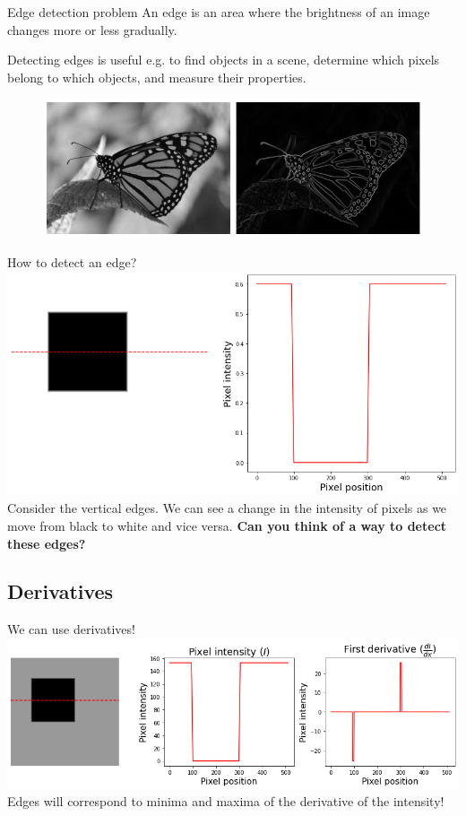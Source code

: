 \documentclass[9pt, aspectratio=169]{beamer}
\begin{document}
\begin{frame}
    {Edge detection problem}
    An edge is an area where the brightness of an image changes more or less gradually.

    Detecting edges is useful e.g. to find objects in a scene, determine which pixels belong to which objects, and measure their properties.
    \begin{figure}
        \includegraphics[width=\textwidth]{monarch_sobel.png}
        \caption{\footnotesize{\color{gray}{Monarch butterfly - CC-BY-SA 2.0 Ted @ Flickr}\color{black}}}
    \end{figure}
\end{frame}

\begin{frame}
    {How to detect an edge?}
    \includegraphics[width=\textwidth]{line_intensity.png}
    Consider the vertical edges. We can see a change in the intensity of pixels as we move from black to white and vice versa. \textbf{Can you think of a way to detect these edges?}
\end{frame}

\subsection{Derivatives}

\begin{frame}
    {We can use derivatives!}
    \includegraphics[width=\textwidth]{intensity_derivative.png}
    Edges will correspond to minima and maxima of the derivative of the intensity!
\end{frame}
\end{document}
